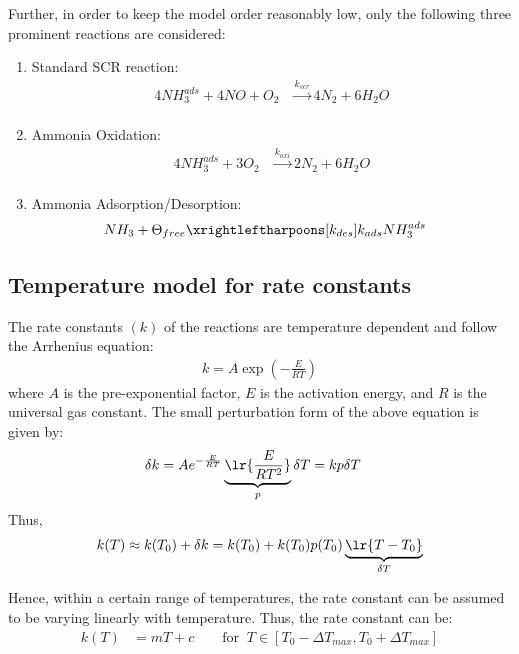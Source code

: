 Further, in order to keep the model order reasonably low, only the following three prominent reactions are considered:
\begin{enumerate}
    \item Standard SCR reaction:
    \begin{align}
        4 NH_3 ^{ads} + 4 NO + O_2 &\xrightarrow[]{k_{scr}} 4 N_2 + 6 H_2O \label{eqn::std_scr}
    \end{align}
    \item Ammonia Oxidation:
    \begin{align}
        4 NH_3^{ads} + 3 O_2 &\xrightarrow[]{k_{oxi}} 2 N_2 + 6 H_2O \label{eqn::amox}
    \end{align}
    \item Ammonia Adsorption/Desorption:
        \begin{align}
            NH_3 + \Theta_{free} &\xrightleftharpoons[k_{des}]{k_{ads}} NH_3^{ads}
            \label{eqn::ads}
        \end{align}
\end{enumerate}


\subsection{Temperature model for rate constants}
The rate constants $(k)$ of the reactions are temperature dependent and follow the Arrhenius equation:
\begin{align*}
    k = A \exp\left(-\frac{E}{RT}\right)
\end{align*}
where $A$ is the pre-exponential factor, $E$ is the activation energy, and $R$ is the universal gas constant. The small
perturbation form of the above equation is given by:
\begin{align*}
    \delta k &= A e^{-\frac{E}{RT}} \underbrace{\lr{\frac{E}{RT^2}}}_p \delta T = k p \delta T
\end{align*}
Thus,
\begin{align*}
    k(T) \approx k(T_0) + \delta k = k(T_0) + k(T_0) p(T_0) \underbrace{\lr{T - T_0}}_{\delta T}
\end{align*}

Hence, within a certain range of temperatures, the rate constant can be assumed to be varying linearly with temperature.
Thus, the rate constant can be:
\begin{align*}
    k(T) &= mT + c \qquad  \text{for } \: T \in [T_0 - \Delta T_{max}, T_0 + \Delta T_{max}]
\end{align*}


